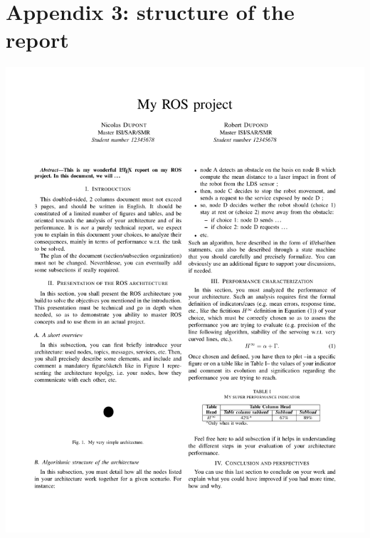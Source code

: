 \documentclass[10pt,a4paper,printanswers]{upmc}
\begin{document}
\newpage
\section{Appendix 3: structure of the report}
\label{sec:report}
\includegraphics[width=\linewidth]{report/myproject.pdf}
\end{document}
